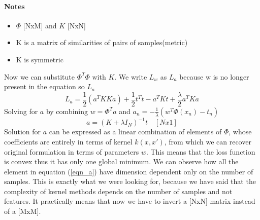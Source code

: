 \documentclass[main.tex]{subfiles}
\begin{document}
\paragraph{Notes}
\begin{itemize}
    \item $\Phi$ [NxM] and $K$ [NxN]
    \item K is a matrix of similarities of pairs of samples(metric)
    \item K is symmetric
\end{itemize}
Now we can substitute $\Phi^T \Phi$ with $K$. We write $L_w$ as $L_a$ because w is no longer present in the equation so $L_a$
\begin{equation*}
    L_a = \frac{1}{2}(a^T K K a) + \frac{1}{2}t^T t - a^T K t +\frac{\lambda}{2} a^T K a
\end{equation*}
Solving for $a$ by combining $w=\Phi^T a$ and $a_n=-\frac{1}{\lambda}(w^T \Phi(x_n)-t_n)$
\begin{equation}
    a = (K + \lambda I_N)^{-1} t \quad [Nx1]
\end{equation} \label{eqn_a}
Solution for $a$ can be expressed as a linear combination of elements of $\Phi$, whose coefficients are entirely in terms of kernel $k(x,x')$, from
which we can recover original formulation in terms of parameters $w$. This means that the loss function is convex thus it has only one global minimum. We can observe how all the element in equation (\ref{eqn_a}) have dimension dependent only on the number of samples. This is exactly what we were looking for, because we have said that the complexity of kernel methods depends on the number of samples and not features. It practically means that now we have to invert a [NxN] matrix instead of a [MxM].
\end{document}
